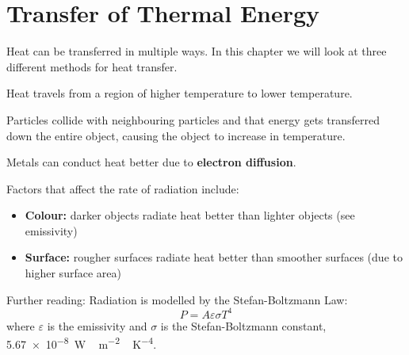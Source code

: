 \documentclass[../main.tex]{subfiles}
\begin{document}
	\section{Transfer of Thermal Energy}
	\begin{preamb}
		Heat can be transferred in multiple ways. In this chapter we will look at three different methods for heat transfer.
	\end{preamb}	
	
	Heat travels from a region of higher temperature to lower temperature.
	
	
	Particles collide with neighbouring particles and that energy gets transferred down the entire object, causing the object to increase in temperature.
	
	Metals can conduct heat better due to \textbf{electron diffusion}.
	
	
	
	Factors that affect the rate of radiation include:
	\begin{itemize}
		\item \textbf{Colour:} darker objects radiate heat better than lighter objects (see emissivity)
		\item \textbf{Surface:} rougher surfaces radiate heat better than smoother surfaces (due to higher surface area)
	\end{itemize}
	
	Further reading: Radiation is modelled by the Stefan-Boltzmann Law:
		\[ P = A \varepsilon \sigma T^4 \]
	where \(\varepsilon\) is the emissivity and \(\sigma\) is the Stefan-Boltzmann constant, \SI{5.67e-8}{\watt \, \meter^{-2} \, \kelvin^{-4}}.
\end{document}
